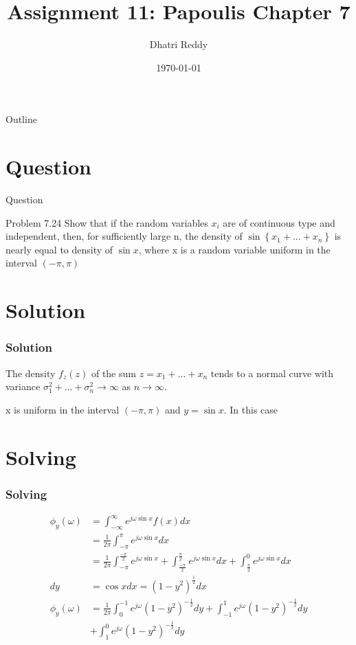 \documentclass{beamer}
\title{Assignment 11: Papoulis Chapter 7 }
\author{Dhatri Reddy}
\date{\today}
\providecommand{\cbrak}[1]{\ensuremath{\left\{#1\right\}}}
\providecommand{\brak}[1]{\ensuremath{\left(#1\right)}}
\begin{document}
\begin{frame}
    \titlepage 
\end{frame}

\logo{}

\begin{frame}{Outline}
    \tableofcontents
\end{frame}

\section{Question}
\begin{frame}{Question}
    \begin{block}{Problem 7.24}
        Show that if the random variables $x_{i}$ are of continuous type and independent, then, for sufficiently large n, the density of $\sin{\cbrak{x_{1} + ... + x_{n}}}$ is nearly equal to density of $\sin{x}$, where x is a random variable uniform in the interval \brak{-\pi, \pi}
\end{block}
\end{frame}

\section{Solution}
\begin{frame}
\frametitle{Solution}

The density $f_{z}\brak{z}$ of the sum $z = x_{1} + ... + x_{n}$ tends to a normal curve with variance $\sigma_{1}^{2} + ... + \sigma_{n}^{2}\to \infty$ as $n \to \infty$.

x is uniform in the interval \brak{-\pi, \pi} and $y = \sin{x}$. 
In this case 

\end{frame}

\section{Solving}
\begin{frame}
\frametitle{Solving}
\begin{align}
    \phi_{y}\brak{\omega} &= \int_{-\infty}^\infty e^{j\omega\sin{x}}f\brak{x}dx\\
    &= \frac{1}{2\pi}\int_{-\pi}^\pi e^{j\omega\sin{x}}dx\\
    &= \frac{1}{2\pi}\int_{-\pi}^\frac{-\pi}{2} e^{j\omega\sin{x}} + \int_{\frac{-\pi}{2}}^\frac{\pi}{2} e^{j\omega\sin{x}} dx + \int_{\frac{\pi}{2}}^{0} e^{j\omega\sin{x}} dx\\
    dy &= \cos{x} dx = \brak{1-y^{2}}^{\frac{1}{2}} dx\\
    \phi_{y}\brak{\omega} &= \frac{1}{2\pi}\int_{0}^{-1}e^{j\omega}\brak{1-y^{2}}^{-\frac{1}{2}} dy  + \int_{-1}^{1}e^{j\omega}\brak{1-y^{2}}^{-\frac{1}{2}} dy\\
    & +\int_{1}^{0}e^{j\omega}\brak{1-y^{2}}^{-\frac{1}{2}} dy
\end{align}
\end{frame}
\end{document}
